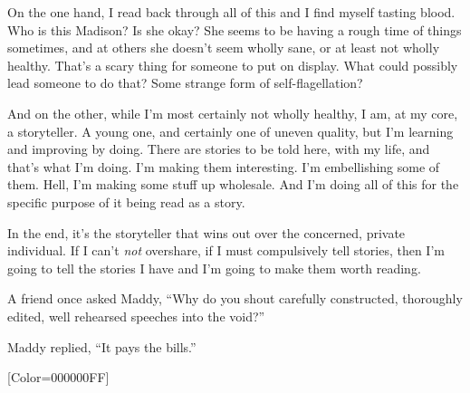 \begin{paracol}{2}
\begin{leftcolumn}
On the one hand, I read back through all of this and I find myself tasting blood. Who is this Madison? Is she okay? She seems to be having a rough time of things sometimes, and at others she doesn't seem wholly sane, or at least not wholly healthy. That's a scary thing for someone to put on display. What could possibly lead someone to do that? Some strange form of self-flagellation?

And on the other, while I'm most certainly not wholly healthy, I am, at my core, a storyteller. A young one, and certainly one of uneven quality, but I'm learning and improving by doing. There are stories to be told here, with my life, and that's what I'm doing. I'm making them interesting. I'm embellishing some of them. Hell, I'm making some stuff up wholesale. And I'm doing all of this for the specific purpose of it being read as a story.

In the end, it's the storyteller that wins out over the concerned, private individual. If I can't \emph{not} overshare, if I must compulsively tell stories, then I'm going to tell the stories I have and I'm going to make them worth reading.

\begin{ally}
A friend once asked Maddy, ``Why do you shout carefully constructed, thoroughly edited, well rehearsed speeches into the void?''
\end{ally}
Maddy replied, ``It pays the bills.''
\newpage
  \end{leftcolumn}
\end{paracol}
\resetbackgroundcolor
\renewfontfamily{}[Color=000000FF]
